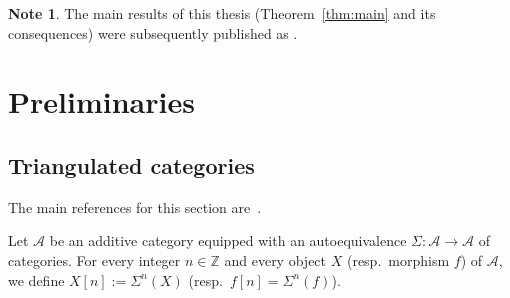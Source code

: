 \documentclass[12pt,a4paper]{article}
\theoremstyle{definition}
\newtheorem{note}[theorem]{Note}
\newcommand{\Z}{\mathbb{Z}}
\begin{document}
\begin{note}
The main results of this thesis (Theorem~\ref{thm:main} and its consequences)
were subsequently published as \cite{GalPel22}.
\end{note}

\section{Preliminaries}
\label{sec:preliminaries}

\subsection{Triangulated categories}

The main references for this section are~\cite{Nee96,BBD}.

Let $\mathcal{A}$ be an additive category equipped with an autoequivalence
$\Sigma:\mathcal{A}\to\mathcal{A}$ of categories.  For every integer $n\in\Z$ and
every object $X$ (resp.\ morphism $f$) of $\mathcal{A}$, we define
$X[n]:=\Sigma^n(X)$ (resp.\ $f[n]=\Sigma^n(f)$).
\end{document}
